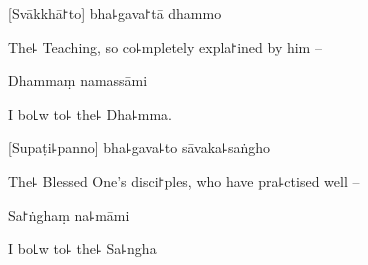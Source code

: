 [Svākkhā꜓to] bha꜕gava꜓tā dhammo

\begin{english}
  The꜕ Teaching, so co꜕mpletely expla꜓ined by him --
\end{english}

Dhammaṃ namassāmi

\begin{english}
  I bo꜖w to꜕ the꜕ Dha꜕mma.
\end{english}


[Supaṭi꜕panno] bha꜕gava꜕to sāvaka꜕saṅgho

\begin{english}
  The꜕ Blessed One's disci꜓ples, who have pra꜕ctised well --
\end{english}

Sa꜓ṅghaṃ na꜕māmi

\begin{english}
  I bo꜖w to꜕ the꜕ Sa꜕ngha
\end{english}


